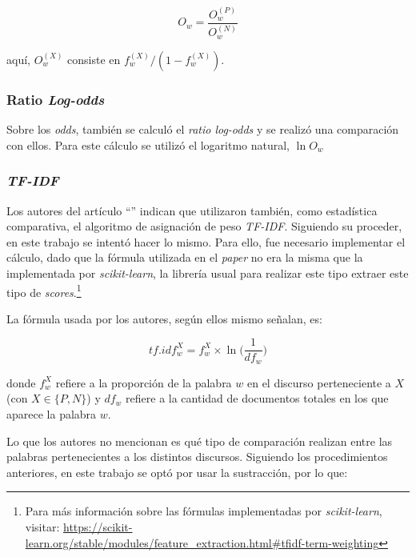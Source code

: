 \begin{equation*}
    O_w = \frac{O_{w}^{(P)}}{O_{w}^{(N)}}
\end{equation*}

aqu\'i, $O_{w}^{(X)}$ consiste en $f_{w}^{(X)}/(1-f_{w}^{(X)})$.

\subsubsection{Ratio \textit{Log-odds}}
Sobre los \textit{odds}, tambi\'en se calcul\'o el \textit{ratio log-odds} y
se realiz\'o una comparaci\'on con ellos. Para este c\'alculo se utiliz\'o el
logaritmo natural, $\ln{O_w}$

\subsubsection{\textit{TF-IDF}}
Los autores del art\'iculo ``'' indican
que utilizaron tambi\'en, como estad\'istica comparativa, el algoritmo de asignaci\'on
de peso \textit{TF-IDF}. Siguiendo su proceder, en este trabajo se intent\'o
hacer lo mismo. Para ello, fue necesario implementar el c\'alculo, dado que
la f\'ormula utilizada en el \textit{paper} no era la misma que la implementada
por \textit{scikit-learn}, la librer\'ia usual para realizar este tipo extraer
este tipo de \textit{scores}.\footnote{Para m\'as informaci\'on sobre las f\'ormulas
implementadas por \textit{scikit-learn}, visitar:
\url{https://scikit-learn.org/stable/modules/feature_extraction.html\#tfidf-term-weighting}}\par
La f\'ormula usada por los autores, seg\'un ellos mismo señalan, es:

\begin{equation*}
    tf.idf_{w}^{X} = f_{w}^{X} \times \ln\bigg({\frac{1}{df_{w}}}\bigg)
\end{equation*}

donde $f_{w}^{X}$ refiere a la proporci\'on de la palabra $w$ en el discurso
perteneciente a $X$ (con $X \in \lbrace P,N \rbrace$) y $df_w$ refiere a la
cantidad de documentos totales en los que aparece la palabra $w$.\par
Lo que los autores no mencionan es qu\'e tipo de comparaci\'on realizan entre las
palabras pertenecientes a los distintos discursos. Siguiendo los procedimientos
anteriores, en este trabajo se opt\'o por usar la sustracci\'on, por lo que:

